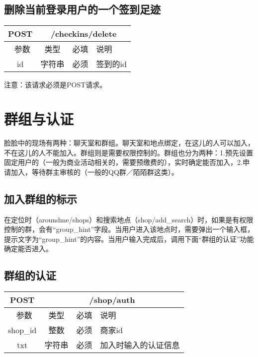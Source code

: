 \documentclass[cs4size]{ctexartutf8}
\begin{document}
\subsection{删除当前登录用户的一个签到足迹}

\begin{table}[H]
   \begin{center}
\begin{tabular}{|c|c|c|p{12cm}|}
\hline
POST & \multicolumn{3}{|c|}{/checkins/delete} \\
\hline\hline
 \  参数  & 类型 & 必填 &  说明  \\
   \hline
 id  & 字符串 & 必须 & 签到的id\\ 
 \hline
\end{tabular}
   \end{center}
\end{table}

注意：该请求必须是POST请求。


\section{群组与认证}
脸脸中的现场有两种：聊天室和群组。聊天室和地点绑定，在这儿的人可以加入，不在这儿的人不能加入。群组则是需要权限控制的。群组也分为两种：1.预先设置固定用户的（一般为商业活动相关的，需要预缴费的），实时确定能否加入，2.申请加入，等待群主审核的（一般的QQ群／陌陌群这类）。

\subsection{加入群组的标示}
在定位时（aroundme/shops）和搜索地点（shop/add\_search）时，如果是有权限控制的群，会有“group\_hint”字段。当用户进入该地点时，需要弹出一个输入框，提示文字为“group\_hint”的内容。当用户输入完成后，调用下面“群组的认证”功能确定能否进入。


\subsection{群组的认证}
\begin{table}[H]
   \begin{center}
\begin{tabular}{|c|c|c|p{12cm}|}
\hline
POST & \multicolumn{3}{|c|}{/shop/auth} \\
\hline\hline
 \  参数  & 类型 & 必填 &  说明  \\
   \hline
 shop\_id  & 整数 & 必须 & 商家id\\ 
  \hline
 txt  & 字符串 & 必须 & 加入时输入的认证信息\\
 \hline
\end{tabular}
   \end{center}
\end{table}
\end{document}
